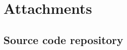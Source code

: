 \documentclass[12pt,a4paper]{report}
\begin{document}



\tableofcontents












\listoffigures

\lstlistoflistings



\ifx\ThesisType\TypePhD
{}
\fi

\appendix
\chapter{Attachments}

\section{Source code repository} \label{attch:repo}
\end{document}
